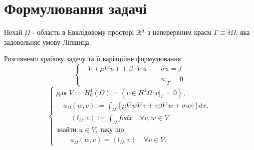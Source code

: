\clearpage
\section{Формулювання задачі}

Нехай $\Omega$ - область в Евклідовому просторі $\mathbb{R}^d$ з неперервним краєм $\Gamma \equiv \delta \Omega$, яка задовольняє умову Ліпшица.

Розглянемо крайову задачу та її варіаційне формулювання:
%
\begin{equation}\label{eq:general_boundary}
	\begin{cases}
			- \nabla (\mu \nabla u) + \beta \cdot \nabla u + &\sigma u = f  \\
			&u|_\Gamma = 0
	\end{cases}
\end{equation}
%
\begin{equation}\label{eq:general_variational}
	\begin{cases}
		\mbox{для } V := H_0^1 \left( \Omega \right) =
		\left\lbrace
			v \in H^1 \Omega : v|_\Gamma = 0
		\right\rbrace, \\

		\quad a_\Omega(w,v) := \displaystyle\int_\Omega
		\left[
			\mu \nabla w \nabla v +v \beta \nabla w + \sigma wv
		\right] dx, \\

		\qquad \left\langle l_\Omega, v \right\rangle := \displaystyle\int_\Omega fvdx \quad \forall v,w \in V \\

		\mbox{знайти }u \in V \mbox{, таку що} \\

		\qquad a_\Omega(w,v) = \left\langle l_\Omega, v \right\rangle \quad \forall v \in V.

	\end{cases}
\end{equation}

